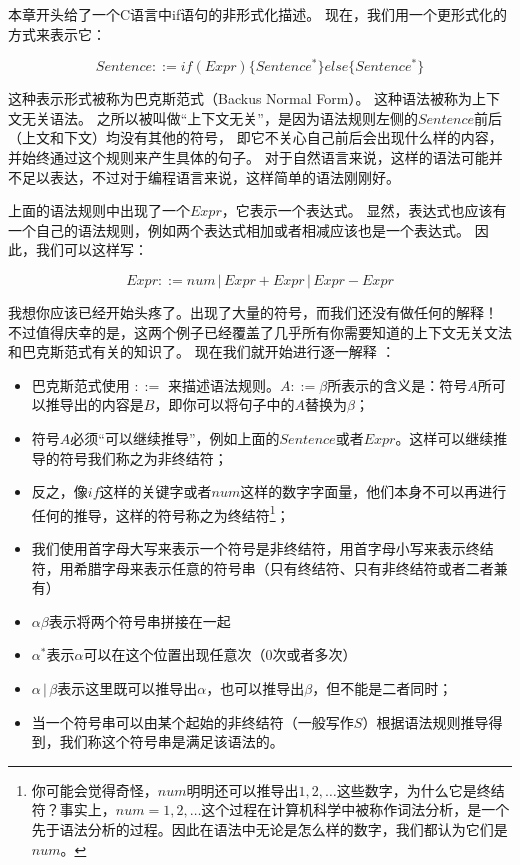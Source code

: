 \documentclass[../main.tex]{subfiles}
\begin{document}
  \indent 本章开头给了一个C语言中if语句的非形式化描述。
  现在，我们用一个更形式化的方式来表示它：

  $$
  Sentence ::= if(Expr)\{ Sentence^*\} else\{Sentence^*\}
  $$

  \indent 这种表示形式被称为巴克斯范式（Backus Normal Form）。
  这种语法被称为上下文无关语法。\cite{bnfwiki}
  之所以被叫做“上下文无关”，是因为语法规则左侧的$Sentence$前后（上文和下文）均没有其他的符号，
  即它不关心自己前后会出现什么样的内容，并始终通过这个规则来产生具体的句子。\cite{cfgwiki}
  对于自然语言来说，这样的语法可能并不足以表达，不过对于编程语言来说，这样简单的语法刚刚好。

  \indent 上面的语法规则中出现了一个$Expr$，它表示一个表达式。
  显然，表达式也应该有一个自己的语法规则，例如两个表达式相加或者相减应该也是一个表达式。
  因此，我们可以这样写：

  $$Expr ::= num\,|\,Expr + Expr\,|\,Expr - Expr$$

  \indent 我想你应该已经开始头疼了。出现了大量的符号，而我们还没有做任何的解释！
  不过值得庆幸的是，这两个例子已经覆盖了几乎所有你需要知道的上下文无关文法和巴克斯范式有关的知识了。
  现在我们就开始进行逐一解释\cite{bnfwiki} \cite{cfgwiki}：

  \begin{itemize}
    \item 巴克斯范式使用 $::=$ 来描述语法规则。$A ::= \beta$所表示的含义是：符号$A$所可以推导出的内容是$B$，即你可以将句子中的$A$替换为$\beta$；
    \item 符号$A$必须“可以继续推导”，例如上面的$Sentence$或者$Expr$。这样可以继续推导的符号我们称之为非终结符；
    \item 反之，像$if$这样的关键字或者$num$这样的数字字面量，他们本身不可以再进行任何的推导，这样的符号称之为终结符\footnote[1]{你可能会觉得奇怪，$num$明明还可以推导出$1, 2, \dots$这些数字，为什么它是终结符？事实上，$num = 1, 2, \dots$这个过程在计算机科学中被称作词法分析，是一个先于语法分析的过程。因此在语法中无论是怎么样的数字，我们都认为它们是$num$。}；
    \item 我们使用首字母大写来表示一个符号是非终结符，用首字母小写来表示终结符，用希腊字母来表示任意的符号串（只有终结符、只有非终结符或者二者兼有）
    \item $\alpha \beta$表示将两个符号串拼接在一起
    \item $\alpha^*$表示$\alpha$可以在这个位置出现任意次（0次或者多次）
    \item $\alpha\,|\,\beta$表示这里既可以推导出$\alpha$，也可以推导出$\beta$，但不能是二者同时；
    \item 当一个符号串可以由某个起始的非终结符（一般写作$S$）根据语法规则推导得到，我们称这个符号串是满足该语法的。
  \end{itemize}
\end{document}
